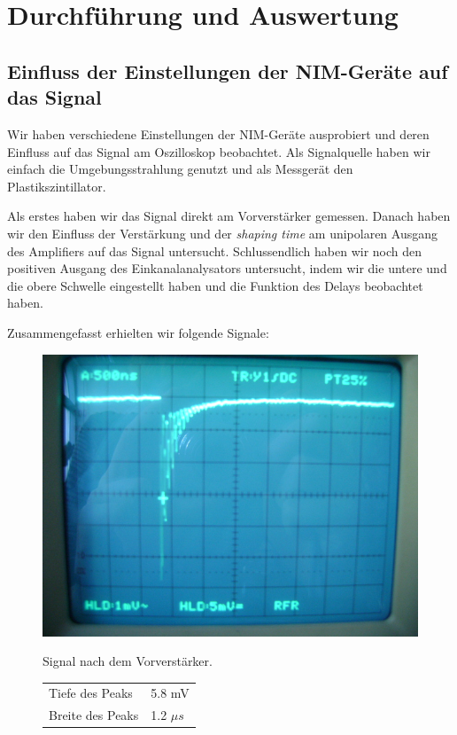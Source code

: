 \section{Durchführung und Auswertung}

\subsection{Einfluss der Einstellungen der NIM-Geräte auf das Signal}

Wir haben verschiedene Einstellungen der NIM-Geräte ausprobiert und deren Einfluss auf das Signal am Oszilloskop beobachtet. Als Signalquelle haben wir einfach die Umgebungsstrahlung genutzt und als Messgerät den Plastikszintillator.

Als erstes haben wir das Signal direkt am Vorverstärker gemessen. Danach haben wir den Einfluss der Verstärkung und der \emph{shaping time} am unipolaren Ausgang des Amplifiers auf das Signal untersucht. Schlussendlich haben wir noch den positiven Ausgang des Einkanalanalysators untersucht, indem wir die untere und die obere Schwelle eingestellt haben und die Funktion des Delays beobachtet haben.

Zusammengefasst erhielten wir folgende Signale:

\begin{figure}[H]
\begin{minipage}{0.4\textwidth}
\centering \includegraphics[width = \textwidth]{messergebnisse/1.JPG}
\end{minipage}
\begin{minipage}{0.6\textwidth}
Signal nach dem Vorverstärker.
\centering \begin{tabular}{l l}
Tiefe des Peaks & 5.8 mV\\
Breite des Peaks & 1.2 $\mu s$
\end{tabular}
\end{minipage}
\end{figure}

